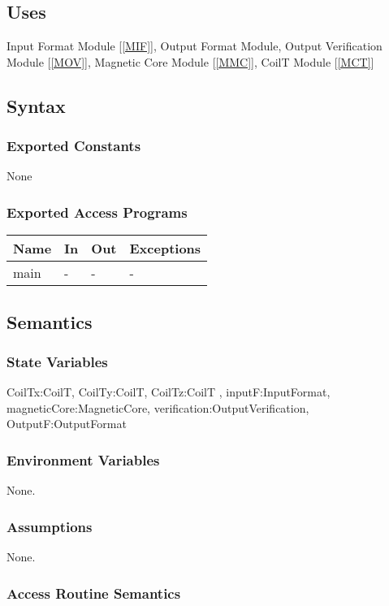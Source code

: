 \documentclass[12pt, titlepage]{article}
\begin{document}
\subsection{Uses}
Input Format Module [\ref{MIF}], Output Format Module, Output Verification Module [\ref{MOV}], Magnetic Core Module [\ref{MMC}], CoilT Module [\ref{MCT}]

\subsection{Syntax}

\subsubsection{Exported Constants}
None
\subsubsection{Exported Access Programs}

\begin{center}
\begin{tabular}{p{6cm} p{4cm} p{3cm} p{2cm}}
\hline
\textbf{Name} & \textbf{In} & \textbf{Out} & \textbf{Exceptions} \\
\hline
main  & - & - & - \\
\hline
\end{tabular}
\end{center}

\subsection{Semantics}

\subsubsection{State Variables}
CoilTx:CoilT,  CoilTy:CoilT,  CoilTz:CoilT , inputF:InputFormat, magneticCore:MagneticCore, verification:OutputVerification, OutputF:OutputFormat
\subsubsection{Environment Variables}
None.
\subsubsection{Assumptions}
None.

\subsubsection{Access Routine Semantics}
\end{document}
